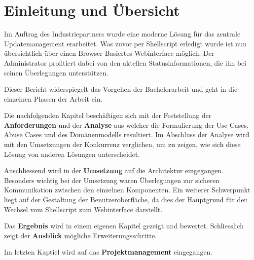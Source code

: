 \begin{comment}
Einführung in die Problem- und Aufgabenstellung. Übersicht über die übrigen Teile der Abgabe.

Diese Einleitung soll für den Ingenieur irgendeiner Fachrichtung verständlich sein. Sie stellt die Aufgabe in einen grösseren Zusammenhang und liefert eine genaue Beschreibung der Problemstellung. Allfällige Vorarbeiten oder ähnlich gelagerte Arbeiten werden diskutiert.
\end{comment}

\chapter{Einleitung und Übersicht}
\xxx[]

Im Auftrag des Industriepartners wurde eine moderne Lösung für das zentrale Updatemanagement erarbeitet. Was zuvor per Shellscript erledigt wurde ist nun übersichtlich über einen Browser-Basiertes Webinterface möglich. Der Administrator profitiert dabei von den aktellen Statusinformationen, die ihn bei seinen Überlegungen unterstützen.

Dieser Bericht widerspiegelt das Vorgehen der Bachelorarbeit und geht in die einzelnen Phasen der Arbeit ein.

Die nachfolgenden Kapitel beschäftigen sich mit der Feststellung der \textbf{Anforderungen} und der \textbf{Analyse} aus welcher die Formulierung der Use Cases, Abuse Cases und des Domänenmodells resultiert. Im Abschluss der Analyse wird mit den Umsetzungen der Konkurrenz verglichen, um zu zeigen, wie sich diese Lösung von anderen Lösungen unterscheidet.

Anschliessend wird in der \textbf{Umsetzung} auf die Architektur eingegangen. Besonders wichtig bei der Umsetzung waren Überlegungen zur sicheren Kommunikation zwischen den einzelnen Komponenten. Ein weiterer Schwerpunkt liegt auf der Gestaltung der Benutzeroberfläche, da dies der Hauptgrund für den Wechsel vom Shellscript zum Webinterface darstellt.

Das \textbf{Ergebnis} wird in einem eigenen Kapitel gezeigt und bewertet. Schliesslich zeigt der \textbf{Ausblick} mögliche Erweiterungsschritte.

Im letzten Kaptiel wird auf das \textbf{Projektmanagement} eingegangen.
